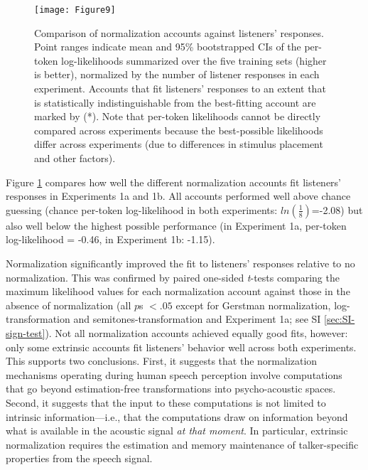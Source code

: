 \documentclass[preprint]{JASA}
\begin{document}
\begin{figure}[!ht]

{\centering \texttt{[image: Figure9]} 

}

\caption{Comparison of normalization accounts against listeners' responses. Point ranges indicate mean and 95\% bootstrapped CIs of the per-token log-likelihoods summarized over the five training sets (higher is better), normalized by the number of listener responses in each experiment. Accounts that fit listeners' responses to an extent that is statistically indistinguishable from the best-fitting account are marked by (*). Note that per-token likelihoods cannot be directly compared across experiments because the best-possible likelihoods differ across experiments (due to differences in stimulus placement and other factors).}\label{fig:Figure9}
\end{figure}

Figure \ref{fig:Figure9} compares how well the different normalization accounts fit listeners' responses in Experiments 1a and 1b. All accounts performed well above chance guessing (chance per-token log-likelihood in both experiments: \(ln(\frac{1}{8})\)=-2.08) but also well below the highest possible performance (in Experiment 1a, per-token log-likelihood = -0.46, in Experiment 1b: -1.15).

Normalization significantly improved the fit to listeners' responses relative to no normalization. This was confirmed by paired one-sided \emph{t}-tests comparing the maximum likelihood values for each normalization account against those in the absence of normalization (all \(p\)s \(< .05\) except for Gerstman normalization, log-transformation and semitones-transformation and Experiment 1a; see SI \ref{sec:SI-sign-test}). Not all normalization accounts achieved equally good fits, however: only some extrinsic accounts fit listeners' behavior well across both experiments. This supports two conclusions. First, it suggests that the normalization mechanisms operating during human speech perception involve computations that go beyond estimation-free transformations into psycho-acoustic spaces. Second, it suggests that the input to these computations is not limited to intrinsic information---i.e., that the computations draw on information beyond what is available in the acoustic signal \emph{at that moment}. In particular, extrinsic normalization requires the estimation and memory maintenance of talker-specific properties from the speech signal.
\end{document}
